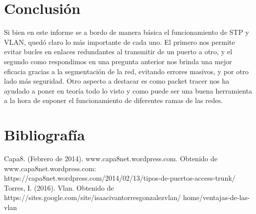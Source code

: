 \documentclass{article}
\begin{document}
\section{Conclusión}
Si bien en este informe se a bordo de manera básica el funcionamiento de STP y VLAN, quedó claro lo más importante de cada uno. El primero nos permite evitar bucles en enlaces redundantes al transmitir de un puerto a otro, y el segundo como respondimos en una pregunta anterior nos brinda una mejor eficacia gracias a la segmentación de la red, evitando errores masivos, y por otro lado más seguridad. Otro aspecto a destacar es como packet tracer nos ha ayudado a poner en teoría todo lo visto y como puede ser una buena herramienta a la hora de suponer el funcionamiento de diferentes ramas de las redes. 

\section{Bibliografía}
Capa8. (Febrero de 2014). www.capa8net.wordpress.com. 
Obtenido de www.capa8net.wordpress.com: https://capa8net.wordpress.com/2014/02/13/tipos-de-puertos-access-trunk/
Torres, I. (2016). Vlan. Obtenido de https://sites.google.com/site/isaacivantorresgonzalezvlan/
home/ventajas-de-las-vlan
\end{document}
